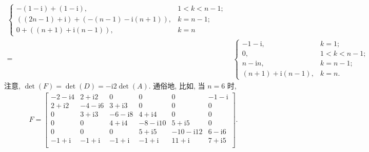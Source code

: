 \documentclass[../libro.tex]{subfiles}
\begin{document}
\begin{example}
\begin{align*}
\begin{cases}
            -(1 - \mathrm{i}) + (1 - \mathrm{i}),                & 1 < k < n - 1; \\
            ((2n-1) + \mathrm{i}) + (-(n-1) - \mathrm{i} (n+1)), & k = n - 1;     \\
            0 + ((n+1) + \mathrm{i} (n-1)),                      & k = n
        \end{cases}
        \\
        = {} &
        \begin{cases}
            -1 - \mathrm{i},          & k = 1;         \\
            0,                        & 1 < k < n - 1; \\
            n - \mathrm{i} n,         & k = n - 1;     \\
            (n+1) + \mathrm{i} (n-1), & k = n.
        \end{cases}
    \end{align*}
    注意, \(\det {(F)} = \det {(D)} = -\mathrm{i} 2 \det {(A)}\).
    通俗地, 比如, 当 \(n = 6\) 时,
    \begin{align*}
        F =
        \begin{bmatrix}
            -2-\mathrm{i}4 & 2+\mathrm{i}2  & 0              & 0               & 0                & -1-\mathrm{i} \\
            2+\mathrm{i}2  & -4-\mathrm{i}6 & 3+\mathrm{i}3  & 0               & 0                & 0             \\
            0              & 3+\mathrm{i}3  & -6-\mathrm{i}8 & 4+\mathrm{i}4   & 0                & 0             \\
            0              & 0              & 4+\mathrm{i}4  & -8-\mathrm{i}10 & 5+\mathrm{i}5    & 0             \\
            0              & 0              & 0              & 5+\mathrm{i}5   & -10-\mathrm{i}12 & 6-\mathrm{i}6 \\
            -1+\mathrm{i}  & -1+\mathrm{i}  & -1+\mathrm{i}  & -1+\mathrm{i}   & 11+\mathrm{i}    & 7+\mathrm{i}5 \\
        \end{bmatrix}.
    \end{align*}


\end{example}
\end{document}
